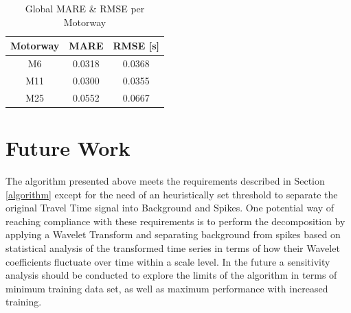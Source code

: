 \documentclass[letterpaper, 10 pt, conference]{ieeeconf}  %
\begin{document}
\begin{table}[htbp]
	\caption{Global MARE \& RMSE per Motorway}
	\begin{center}
		\begin{tabular}{|c|c|c|}
			\hline
			\textbf{Motorway}&{\textbf{MARE}}&{\textbf{RMSE [s]}} \\
			\hline
			M6& 0.0318& 0.0368\\
			\hline
			M11& 0.0300& 0.0355\\
			\hline
			M25& 0.0552& 0.0667\\
			\hline
		\end{tabular}
		\label{mapeglobal}
	\end{center}
\end{table}

\section{Future Work}
The algorithm presented above meets the requirements described in Section \ref{algorithm} except for the need of an heuristically set threshold to separate the original Travel Time signal into Background and Spikes.
One potential way of reaching compliance with these requirements is to perform the decomposition by applying a Wavelet Transform and separating background from spikes based on statistical analysis of the transformed time series in terms of how their Wavelet coefficients fluctuate over time within a scale level. 
In the future a sensitivity analysis should be conducted to explore the limits of the algorithm in terms of minimum training data set, as well as maximum performance with increased training.\\
 \\
 \\
 \\
 \\
 
\end{document}
